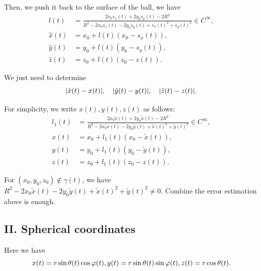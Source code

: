 \documentclass[a4paper]{article}
\begin{document}
Then, we push it back to the surface of the ball, we have
\begin{equation}
    \begin{aligned}
        l(t) &= \frac{2x_0 s_x(t)+2y_0 s_y(t) - 2 R^2}{R^2 - 2x_0 s_x(t) - 2y_0 s_y(t) + s_x(t)^2 + s_y(t)^2} \in C^{\infty}, \\
        \hat{x}(t) &= x_0 + l(t) (x_0 - s_x(t)), \\
        \hat{y}(t) &= y_0 + l(t) (y_0 - s_y(t)), \\
        \hat{z}(t) &= z_0 + l(t) (z_0 - z(t)).
    \end{aligned}
\end{equation}

We just need to determine 
\begin{equation}
    \abs{\hat{x}(t) - x(t)}, \quad \abs{\hat{y}(t) - y(t)}, \quad \abs{\hat{z}(t) - z(t)}.
\end{equation}

For simplicity, we write $x(t), y(t), z(t)$ as follows:
\begin{equation}
    \begin{aligned}
        l_1(t) &= \frac{2x_0 \tilde{x}(t)+2y_0 \tilde{x}(t) - 2 R^2}{R^2 - 2x_0 \tilde{x}(t) - 2y_0 \tilde{y}(t) + \tilde{x}(t)^2 + \tilde{y}(t)^2} \in C^{\infty}, \\
        x(t) &= x_0 + l_1(t) (x_0 - \tilde{x}(t)), \\
        y(t) &= y_0 + l_1(t) (y_0 - \tilde{y}(t)), \\
        z(t) &= z_0 + l_1(t) (z_0 - z(t)).
    \end{aligned}
\end{equation}

For $(x_0, y_0, z_0) \notin \gamma (t)$, we have $R^2 - 2x_0 \tilde{x}(t) - 2y_0 \tilde{y}(t) + \tilde{x}(t)^2 + \tilde{y}(t)^2 \ne 0$. 
Combine the error estimation above is enough. 


\subsection{II. Spherical coordinates}

Here we have 
\begin{equation}
    x(t) = r \sin \theta(t) \cos \varphi(t), \\
    y(t) = r \sin \theta(t) \sin \varphi(t), \\
    z(t) = r \cos \theta(t).
\end{equation}
\end{document}
